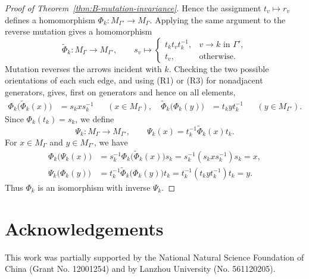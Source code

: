\documentclass[a4paper, 12pt, reqno]{amsart}
\theoremstyle{definition}
\begin{document}
\begin{proof}[Proof of Theorem~\ref{thm:B-mutation-invariance}]
Hence the assignment $t_v\mapsto r_v$ defines a homomorphism $\Phi_k:M_{\Gamma'}\longrightarrow M_\Gamma.$ Applying the same argument to the reverse mutation gives a homomorphism
\[
\widetilde\Phi_k:M_\Gamma\longrightarrow M_{\Gamma'}, \qquad s_v\longmapsto
\begin{cases}
t_kt_vt_k^{-1},&v\to k\text{ in }\Gamma',\\
t_v,&\text{otherwise}.
\end{cases}
\]
Mutation reverses the arrows incident with $k$. Checking the two possible orientations of each such edge, and using (R1) or (R3) for nonadjacent generators, gives, first on generators and hence on all elements,
\[
\begin{aligned}
\Phi_k\bigl(\widetilde\Phi_k(x)\bigr) & = s_kxs_k^{-1} &&(x\in M_\Gamma),\quad \widetilde\Phi_k\bigl(\Phi_k(y)\bigr) & = t_kyt_k^{-1} &&(y\in M_{\Gamma'}).
\end{aligned}
\]
Since $\Phi_k(t_k)=s_k$, we define
\[
\Psi_k:M_\Gamma\longrightarrow M_{\Gamma'}, \qquad \Psi_k(x)=t_k^{-1}\widetilde\Phi_k(x)t_k.
\]
For $x\in M_\Gamma$ and $y\in M_{\Gamma'}$, we have
\[
\begin{aligned}
\Phi_k\bigl(\Psi_k(x)\bigr) & =s_k^{-1}\Phi_k\bigl(\widetilde\Phi_k(x)\bigr)s_k =s_k^{-1}(s_kxs_k^{-1})s_k=x,\\
\Psi_k\bigl(\Phi_k(y)\bigr) &=t_k^{-1}\widetilde\Phi_k\bigl(\Phi_k(y)\bigr)t_k =t_k^{-1}(t_kyt_k^{-1})t_k=y.
\end{aligned}
\]
Thus $\Phi_k$ is an isomorphism with inverse $\Psi_k$.
\end{proof}


\section*{Acknowledgements}
This work was partially supported by the National Natural Science Foundation of China (Grant No. 12001254) and by Lanzhou University (No. 561120205).
\end{document}
